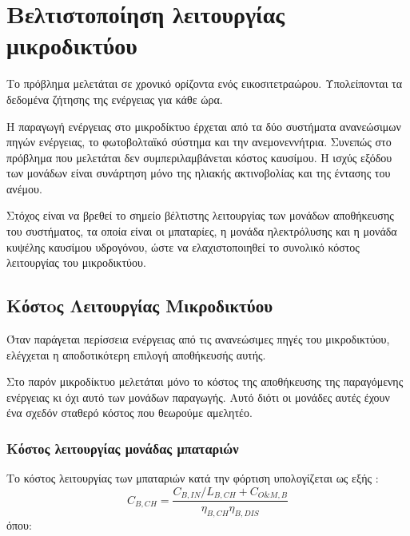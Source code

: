 \chapter{Βελτιστοποίηση λειτουργίας μικροδικτύου}
Το πρόβλημα μελετάται σε χρονικό ορίζοντα ενός εικοσιτετραώρου. Υπολείπονται τα δεδομένα ζήτησης της ενέργειας για κάθε ώρα.

Η παραγωγή ενέργειας στο μικροδίκτυο έρχεται από τα δύο συστήματα ανανεώσιμων πηγών ενέργειας, το φωτοβολταϊκό σύστημα και την ανεμονεννήτρια. Συνεπώς στο πρόβλημα που μελετάται δεν συμπεριλαμβάνεται κόστος καυσίμου. Η ισχύς εξόδου των μονάδων είναι συνάρτηση μόνο της ηλιακής ακτινοβολίας και της έντασης του ανέμου.

Στόχος είναι να βρεθεί το σημείο βέλτιστης λειτουργίας των μονάδων αποθήκευσης του συστήματος, τα οποία είναι οι μπαταρίες, η μονάδα ηλεκτρόλυσης και η μονάδα κυψέλης καυσίμου υδρογόνου, ώστε να ελαχιστοποιηθεί το συνολικό κόστος λειτουργίας του μικροδικτύου.


\section{Κόστoς Λειτουργίας Μικροδικτύου}
Όταν παράγεται περίσσεια ενέργειας από τις ανανεώσιμες πηγές του μικροδικτύου, ελέγχεται η αποδοτικότερη επιλογή αποθήκευσής αυτής. 

Στο παρόν μικροδίκτυο μελετάται μόνο το κόστος της αποθήκευσης της παραγόμενης ενέργειας κι όχι αυτό των μονάδων παραγωγής. Αυτό διότι οι μονάδες αυτές έχουν ένα σχεδόν σταθερό κόστος που θεωρούμε αμελητέο.

\subsection{Κόστος λειτουργίας μονάδας μπαταριών}
Το κόστος λειτουργίας των μπαταριών κατά την φόρτιση υπολογίζεται ως εξής \cite{CAU2014820}:
\begin{equation}
    C_{B,CH} = \frac{C_{B,IN}/L_{B,CH} + C_{O\&M,B}}{η_{B,CH}η_{B,DIS}}
\end{equation}
όπου:

